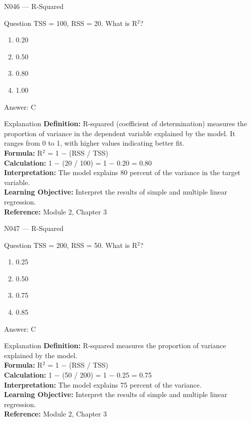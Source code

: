 \documentclass[aspectratio=169,8pt]{beamer}
\begin{document}
	\begin{frame}{N046 --- R-Squared}
		\begin{block}{Question}
			TSS = 100, RSS = 20. What is R$^{2}$?
			\begin{enumerate}
				\item 0.20
				\item 0.50
				\item 0.80
				\item 1.00
			\end{enumerate}
		\end{block}
		\begin{exampleblock}{Answer: C}\end{exampleblock}
		\begin{block}{Explanation}
			\textbf{Definition:} R-squared (coefficient of determination) measures the proportion of variance in the dependent variable explained by the model. It ranges from 0 to 1, with higher values indicating better fit.\\
			\textbf{Formula:} R$^{2}$ = 1 $-$ (RSS / TSS)\\
			\textbf{Calculation:} 1 $-$ (20 / 100) = 1 $-$ 0.20 = 0.80\\
			\textbf{Interpretation:} The model explains 80 percent of the variance in the target variable.\\
			\textbf{Learning Objective:} Interpret the results of simple and multiple linear regression.\\
			\textbf{Reference:} Module 2, Chapter 3
		\end{block}
	\end{frame}
	
	\begin{frame}{N047 --- R-Squared}
		\begin{block}{Question}
			TSS = 200, RSS = 50. What is R$^{2}$?
			\begin{enumerate}
				\item 0.25
				\item 0.50
				\item 0.75
				\item 0.85
			\end{enumerate}
		\end{block}
		\begin{exampleblock}{Answer: C}\end{exampleblock}
		\begin{block}{Explanation}
			\textbf{Definition:} R-squared measures the proportion of variance explained by the model.\\
			\textbf{Formula:} R$^{2}$ = 1 $-$ (RSS / TSS)\\
			\textbf{Calculation:} 1 $-$ (50 / 200) = 1 $-$ 0.25 = 0.75\\
			\textbf{Interpretation:} The model explains 75 percent of the variance.\\
			\textbf{Learning Objective:} Interpret the results of simple and multiple linear regression.\\
			\textbf{Reference:} Module 2, Chapter 3
		\end{block}
	\end{frame}
	
\end{document}
